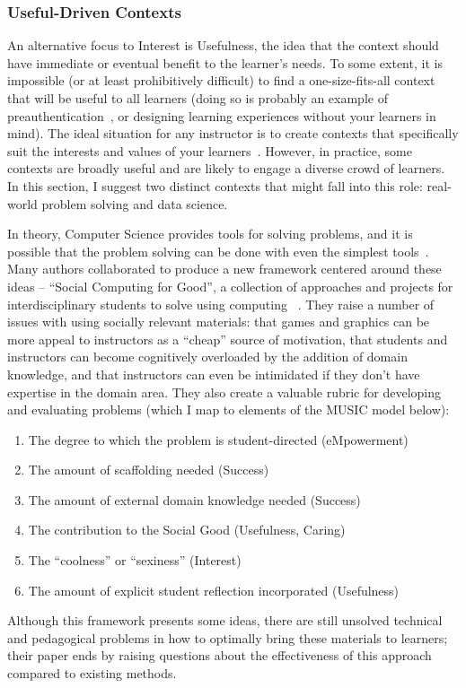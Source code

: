 \subsubsection{Useful-Driven Contexts}

An alternative focus to Interest is Usefulness, the idea that the context should have immediate or eventual benefit to the learner's needs.
To some extent, it is impossible (or at least prohibitively difficult) to find a one-size-fits-all context that will be useful to all learners (doing so is probably an example of preauthentication~\cite{preauthentication}, or designing learning experiences without your learners in mind).
The ideal situation for any instructor is to create contexts that specifically suit the interests and values of your learners~\cite{DiSalvo:2011}.
However, in practice, some contexts are broadly useful and are likely to engage a diverse crowd of learners.
In this section, I suggest two distinct contexts that might fall into this role: real-world problem solving and data science.

In theory, Computer Science provides tools for solving problems, and it is possible that the problem solving can be done with even the simplest tools~\cite{Layman:2007, Social-good}.
Many authors collaborated to produce a new framework centered around these ideas -- ``Social Computing for Good'', a collection of approaches and projects for interdisciplinary students to solve using computing ~\cite{Social-good}.
They raise a number of issues with using socially relevant materials: that games and graphics can be more appeal to instructors as a ``cheap'' source of motivation, that students and instructors can become cognitively overloaded by the addition of domain knowledge, and that instructors can even be intimidated if they don't have expertise in the domain area.
They also create a valuable rubric for developing and evaluating problems (which I map to elements of the MUSIC model below):
\begin{enumerate}
	\item The degree to which the problem is student-directed (eMpowerment)
	\item The amount of scaffolding needed (Success)
	\item The amount of external domain knowledge needed (Success)
	\item The contribution to the Social Good (Usefulness, Caring)
	\item The ``coolness'' or ``sexiness'' (Interest)
	\item The amount of explicit student reflection incorporated (Usefulness)
\end{enumerate}
Although this framework presents some ideas, there are still unsolved technical and pedagogical problems in how to optimally bring these materials to learners; their paper ends by raising questions about the effectiveness of this approach compared to existing methods.

